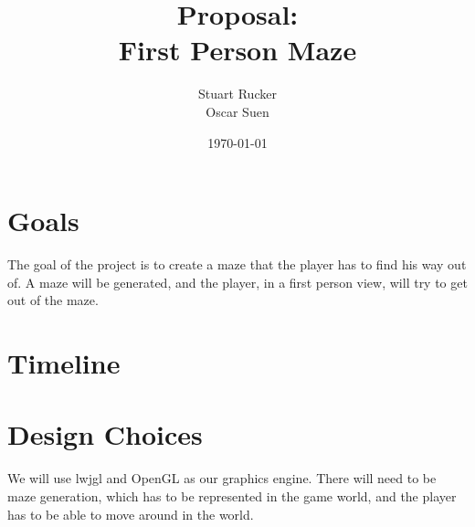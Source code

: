 \documentclass[12pt]{article}
\title{Proposal: \\ First Person Maze}
\author{Stuart Rucker \\ Oscar Suen}
\date{\today}
\begin{document}
\maketitle
\section{Goals}
The goal of the project is to create a maze that the player has to find his way out of.  A maze will be generated, and the player, in a first person view, will try to get out of the maze.
\section{Timeline}
\section{Design Choices}
We will use lwjgl and OpenGL as our graphics engine.  There will need to be maze generation, which has to be represented in the game world, and the player has to be able to move around in the world.
\end{document}
